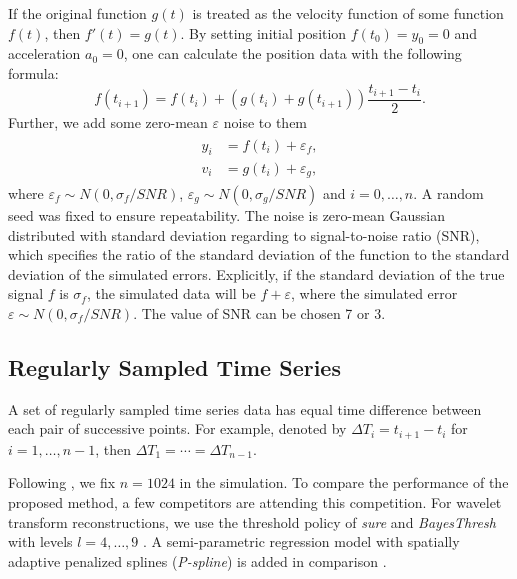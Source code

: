If the original function $g(t)$ is treated as the velocity function of some function $f(t)$, then $f'(t)=g(t)$. By setting initial position $f(t_0)=y_0=0$ and acceleration $a_0=0$, one can calculate the position data with the following formula: 
\begin{equation}\label{generateVelocity}
f(t_{i+1})=f(t_i)+\left(g(t_i)+g(t_{i+1}) \right)\frac{t_{i+1}-t_i}{2}. 
\end{equation}
Further, we add some \iid  zero-mean $\varepsilon$ noise to them 
\begin{align}\label{tractorsplinegeneratefunctions}
\begin{split}
y_i &= f(t_i) + \varepsilon_f, \\
v_i &= g(t_i) + \varepsilon_g,
\end{split}
\end{align}
where $\varepsilon_f\sim N(0,\sigma_f/SNR)$, $\varepsilon_g\sim N(0,\sigma_g/SNR)$ and $i=0,\ldots,n$. A random seed was fixed to ensure repeatability. The noise is \iid zero-mean Gaussian distributed with standard deviation regarding to signal-to-noise ratio (SNR), which specifies the ratio of the standard deviation of the function to the standard deviation of the simulated errors. Explicitly, if the standard deviation of the true signal $f$ is $\sigma_f$, the simulated data will be $f+\varepsilon$, where the simulated error  $\varepsilon \sim N(0,\sigma_f/SNR)$. The value of SNR can be chosen 7 or 3. 



\subsection{Regularly Sampled Time Series}

A set of regularly sampled time series data has equal time difference between each pair of successive points. For example, denoted by $\Delta T_i = t_{i+1}-t_i$ for $i=1,\ldots,n-1$, then $\Delta T_1=\cdots = \Delta T_{n-1}$.

Following \cite{nason2010wavelet}, we fix $n=1024$ in the simulation. To compare the performance of the proposed method, a few competitors are attending this competition. For wavelet transform reconstructions, we use the threshold policy of \textit{sure} and \textit{BayesThresh} with levels $l=4, \ldots, 9$  \citep{donoho1995adapting, abramovich1998wavelet}. A semi-parametric regression model with spatially adaptive penalized splines (\textit{P-spline}) is added in comparison  \citep{krivobokova2008fast, ruppert2003semiparametric}.

